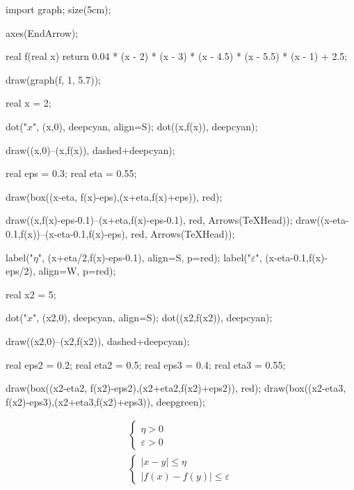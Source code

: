 \begin{rmk}
	\begin{center}
		\begin{asy}
			import graph;
			size(5cm);

			axes(EndArrow);

			real f(real x) { return 0.04 * (x - 2) * (x - 3) * (x - 4.5) * (x - 5.5) * (x - 1) + 2.5; }

			draw(graph(f, 1, 5.7));

			real x = 2;

			dot("$x$", (x,0), deepcyan, align=S);
			dot((x,f(x)), deepcyan);
			
			draw((x,0)--(x,f(x)), dashed+deepcyan);

			real eps = 0.3;
			real eta = 0.55;

			draw(box((x-eta, f(x)-eps),(x+eta,f(x)+eps)), red);

			draw((x,f(x)-eps-0.1)--(x+eta,f(x)-eps-0.1), red, Arrows(TeXHead));
			draw((x-eta-0.1,f(x))--(x-eta-0.1,f(x)-eps), red, Arrows(TeXHead));

			label("$\eta$", (x+eta/2,f(x)-eps-0.1), align=S, p=red);
			label("$\varepsilon$", (x-eta-0.1,f(x)-eps/2), align=W, p=red);

			real x2 = 5;

			dot("$x$", (x2,0), deepcyan, align=S);
			dot((x2,f(x2)), deepcyan);
			
			draw((x2,0)--(x2,f(x2)), dashed+deepcyan);

			real eps2 = 0.2;
			real eta2 = 0.5;
			real eps3 = 0.4;
			real eta3 = 0.55;

			draw(box((x2-eta2, f(x2)-eps2),(x2+eta2,f(x2)+eps2)), red);
			draw(box((x2-eta3, f(x2)-eps3),(x2+eta3,f(x2)+eps3)), deepgreen);
		\end{asy}
	\end{center}

	\[
		\begin{array}{c}
			\begin{cases}
				\eta>0\\
				\varepsilon>0
			\end{cases}\\
			\begin{cases}
				\left| x-y \right| \le \eta\\
				\left| f(x)-f(y) \right| \le \varepsilon
			\end{cases}
		\end{array}
	\]
\end{rmk}

